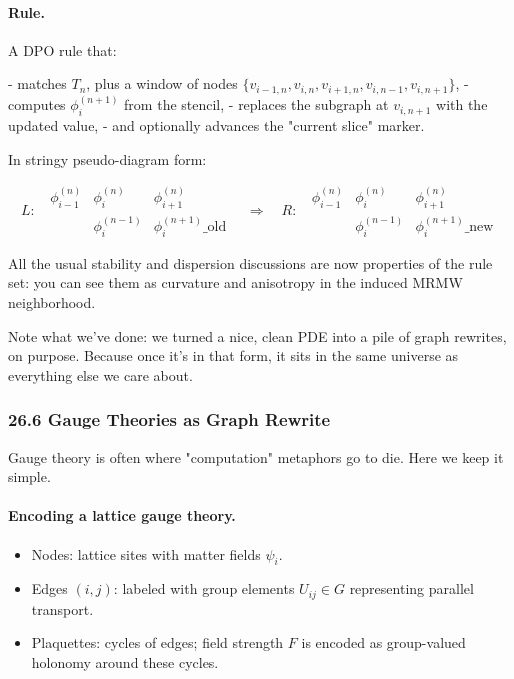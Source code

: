 \paragraph{Rule.}

A DPO rule that:

- matches $T_n$, plus a window of nodes $\{v_{i-1,n}, v_{i,n}, v_{i+1,n}, v_{i,n-1}, v_{i,n+1}\}$,
- computes $\phi_i^{(n+1)}$ from the stencil,
- replaces the subgraph at $v_{i,n+1}$ with the updated value,
- and optionally advances the "current slice" marker.

In stringy pseudo-diagram form:

\[
  L: \;\;
  \begin{matrix}
    \phi_{i-1}^{(n)} & \phi_i^{(n)} & \phi_{i+1}^{(n)} \\
    & \phi_i^{(n-1)} & \phi_i^{(n+1)}\_\text{old}
  \end{matrix}
  \quad\Rightarrow\quad
  R: \;\;
  \begin{matrix}
    \phi_{i-1}^{(n)} & \phi_i^{(n)} & \phi_{i+1}^{(n)} \\
    & \phi_i^{(n-1)} & \phi_i^{(n+1)}\_\text{new}
  \end{matrix}
\]

All the usual stability and dispersion discussions are now properties of the rule set:
you can see them as curvature and anisotropy in the induced MRMW neighborhood.

Note what we’ve done: we turned a nice, clean PDE into a pile of graph rewrites, on purpose. Because once it’s in that form, it sits in the same universe as everything else we care about.

\subsubsection*{26.6  Gauge Theories as Graph Rewrite}

Gauge theory is often where "computation" metaphors go to die. Here we keep it simple.

\paragraph{Encoding a lattice gauge theory.}

\begin{itemize}
  \item Nodes: lattice sites with matter fields $\psi_i$.
  \item Edges $(i,j)$: labeled with group elements $U_{ij} \in G$ representing parallel transport.
  \item Plaquettes: cycles of edges; field strength $F$ is encoded as group-valued holonomy around these cycles.
\end{itemize}

